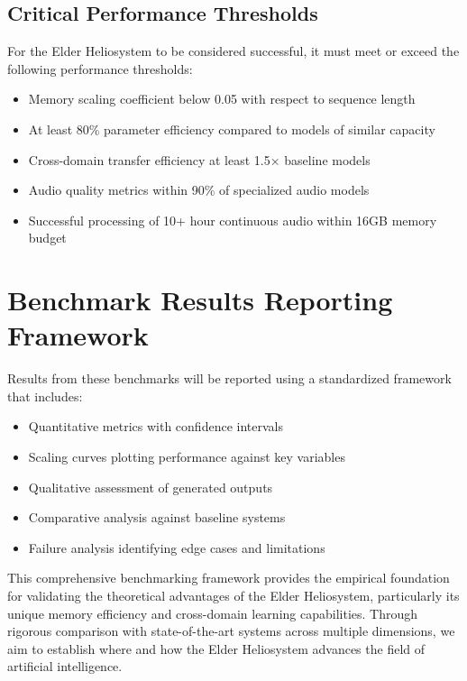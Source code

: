 \subsection{Critical Performance Thresholds}

For the Elder Heliosystem to be considered successful, it must meet or exceed the following performance thresholds:

\begin{itemize}
    \item Memory scaling coefficient below 0.05 with respect to sequence length
    \item At least 80\% parameter efficiency compared to models of similar capacity
    \item Cross-domain transfer efficiency at least 1.5× baseline models
    \item Audio quality metrics within 90\% of specialized audio models
    \item Successful processing of 10+ hour continuous audio within 16GB memory budget
\end{itemize}

\section{Benchmark Results Reporting Framework}

Results from these benchmarks will be reported using a standardized framework that includes:

\begin{itemize}
    \item Quantitative metrics with confidence intervals
    \item Scaling curves plotting performance against key variables
    \item Qualitative assessment of generated outputs
    \item Comparative analysis against baseline systems
    \item Failure analysis identifying edge cases and limitations
\end{itemize}

This comprehensive benchmarking framework provides the empirical foundation for validating the theoretical advantages of the Elder Heliosystem, particularly its unique memory efficiency and cross-domain learning capabilities. Through rigorous comparison with state-of-the-art systems across multiple dimensions, we aim to establish where and how the Elder Heliosystem advances the field of artificial intelligence.